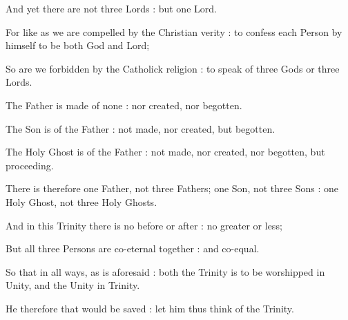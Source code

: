 {    And yet there are not three Lords : but one Lord.\par
    For like as we are compelled by the Christian verity : to confess each Person by himself to be both God and Lord;\par
    So are we forbidden by the Catholick religion : to speak of three Gods or three Lords.\par
    The Father is made of none : nor created, nor begotten.\par
    The Son is of the Father : not made, nor created, but begotten.\par
    The Holy Ghost is of the Father : not made, nor created, nor begotten, but proceeding.\par
    There is therefore one Father, not three Fathers; one Son, not three Sons : one Holy Ghost, not three Holy Ghosts.\par
    And in this Trinity there is no before or after : no greater or less;\par
    But all three Persons are co-eternal together : and co-equal.\par
    So that in all ways, as is aforesaid : both the Trinity is to be worshipped in Unity, and the Unity in Trinity.\par
    He therefore that would be saved : let him thus think of the Trinity.\par

}
